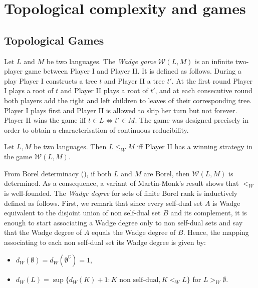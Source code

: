 
\section{Topological complexity and games}

\subsection{Topological Games}
Let $L$ and $M$ be two languages. The {\em Wadge game}
$\mathcal{W}(L, M)$ is an infinite two-player game between Player I and Player II. It is defined as follows. During a play Player I constructs a tree $t$ and Player II a tree $t'$. At the first round Player I plays a root of $t$ and Player II plays a root of $t'$, and at each consecutive round both players add the right and left children to leaves
of their corresponding tree. Player I plays first and Player II is allowed to
skip her turn but not forever.  Player II wins the game iff $t \in L
\Leftrightarrow t' \in M$.  
The game was designed precisely in order to obtain a characterisation of continuous reducibility.
\begin{lemma}
Let $L, M$ be two languages. Then  $L \leq_W M$ iff Player II has a winning strategy in the game $\mathcal{W}(L, M)$.
\end{lemma}


From Borel determinacy (\cite{martin}),
if both $L$ and $M$ are Borel, then $\mathcal{W}(L, M)$ is determined.
As a consequence, a variant of Martin-Monk's result shows that $<_W$ is
well-founded. The \emph{Wadge degree} for sets of finite Borel rank is
inductively defined as follows. First, we remark that since every self-dual set $A$ is Wadge equivalent to the disjoint union of non self-dual set $B$ and its complement, it is enough to start associating a Wadge degree only to non self-dual sets and say that the Wadge degree of $A$ equals the Wadge degree of $B$. Hence, the mapping associating to each non self-dual set its Wadge degree is given by:
\begin{itemize}
\item $d_W(\emptyset)=d_W(\emptyset^\complement)=1$,
\item $d_W(L)=\sup\{d_W(K)+1\colon K \text{ non self-dual}, K <_WL\}$ for $L>_W\emptyset$.
\end{itemize}

